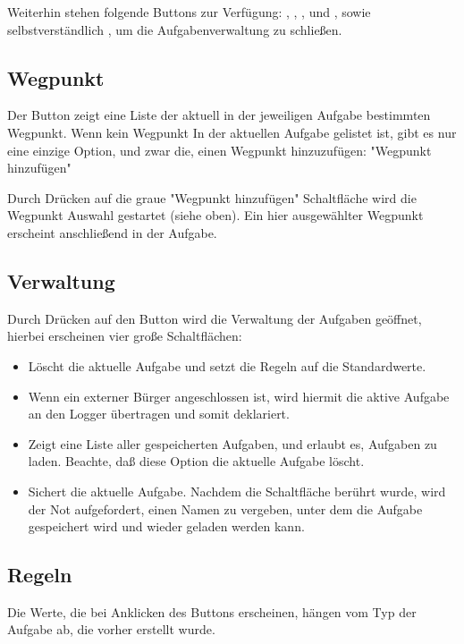 Weiterhin stehen folgende Buttons zur Verfügung:  , , , und , sowie selbstverständlich ,
um die Aufgabenverwaltung zu schließen.

\subsection*{Wegpunkt}
Der Button   zeigt eine Liste der aktuell in der jeweiligen Aufgabe bestimmten Wegpunkt. Wenn kein Wegpunkt In der aktuellen Aufgabe gelistet ist, gibt es nur eine einzige Option, und zwar die, einen Wegpunkt hinzuzufügen: "Wegpunkt hinzufügen"

Durch Drücken auf die graue "Wegpunkt hinzufügen" Schaltfläche wird die Wegpunkt Auswahl gestartet (siehe oben).  Ein hier ausgewählter Wegpunkt erscheint anschließend in der Aufgabe.

\subsection*{Verwaltung}

Durch Drücken auf den Button  wird die Verwaltung der Aufgaben geöffnet, hierbei erscheinen vier große Schaltflächen:

\begin{itemize}
\item {} Löscht die aktuelle Aufgabe und setzt die Regeln auf die Standardwerte.
\item {} Wenn ein externer Bürger angeschlossen ist, wird hiermit die aktive Aufgabe an den Logger übertragen und somit deklariert.
\item {} Zeigt eine Liste aller gespeicherten Aufgaben, und erlaubt es, Aufgaben zu laden. Beachte, daß diese Option die aktuelle Aufgabe löscht.
\item {} Sichert die aktuelle Aufgabe. Nachdem die Schaltfläche berührt wurde, wird der Not aufgefordert, einen Namen zu vergeben, unter dem die Aufgabe gespeichert wird und wieder geladen werden kann.
\end{itemize}

\subsection*{Regeln}

Die Werte, die bei Anklicken des Buttons  erscheinen, hängen vom Typ der Aufgabe ab, die vorher erstellt wurde.

